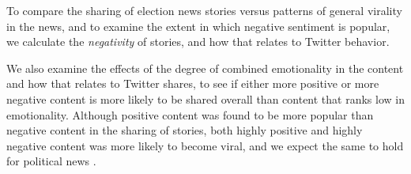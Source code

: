 To compare the sharing of election news stories versus patterns of general virality in the news, and to examine the extent in which negative sentiment is popular, we calculate the \emph{negativity} of stories, and how that relates to Twitter behavior.

We also examine the effects of the degree of combined emotionality in the content and how that relates to Twitter shares, to see if either more positive or more negative content is more likely to be shared overall than content that ranks low in emotionality. Although positive content was found to be more popular than negative content in the sharing of stories, both highly positive and highly negative content was more likely to become viral, and we expect the same to hold for political news \cite{berger2012makes}. 












